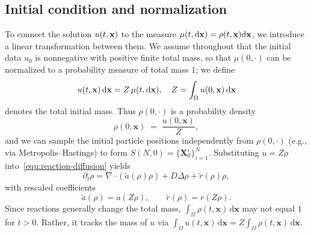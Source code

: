 \documentclass[a4paper,fleqn]{cas-sc}
\theoremstyle{definition}
\theoremstyle{remark}
\begin{document}
\subsection{Initial condition and normalization}
To connect the solution $u(t,\mathbf{x})$ to the measure $\mu(t,\mathrm{d}\mathbf{x})=\rho(t,\mathbf{x}) \mathrm{d} \mathbf{x}$, we introduce a linear transformation between them. 
We assume throughout that the initial data $u_0$ is nonnegative with positive finite total mass, so that $\mu(0,\cdot)$ can be normalized to a probability measure of total mass $1$; we define
\begin{equation*}
    u(t,\mathbf{x})\,\mathrm{d}\mathbf{x} = Z \,\mu(t,\mathrm{d}\mathbf{x}), \quad 
Z = \int_{\Omega} u(0,\mathbf{x})\,\mathrm{d}\mathbf{x}
\end{equation*}
denotes the total initial mass.
Thus $\rho(0,\cdot)$ is a probability density
\[
\rho(0,\mathbf{x}) \;=\; \frac{u(0,\mathbf{x})}{Z},
\]
and we can sample the initial particle positions independently from $\rho(0,\cdot)$ (e.g., via Metropolis–Hastings) to form $S(N,0)=\{\mathbf{X}^i_0\}_{i=1}^N$. 
Substituting $u=Z\rho$ into~\eqref{equ:reaction-diffusion}  yields
\begin{equation}\label{equ:normalized_diffusion_reaction}
\partial_t \rho 
= \nabla \cdot \left( \tilde a(\rho)\rho \right)+ D \Delta\rho 
  + \tilde r(\rho)\rho,
\end{equation}
with rescaled coefficients
\[
\tilde a(\rho) = a(Z\rho),  
\qquad \tilde r(\rho) = r(Z\rho).
\]
Since reactions generally change the total mass, $\int_{\Omega}\rho(t,\mathbf{x})\,\mathrm{d}\mathbf{x}$ may not equal $1$ for $t>0$. Rather, it tracks the mass of $u$ via $\int_{\Omega} u(t,\mathbf{x})\,\mathrm{d}\mathbf{x} = Z \int_{\Omega} \rho(t,\mathbf{x})\,\mathrm{d}\mathbf{x}$.
\end{document}
